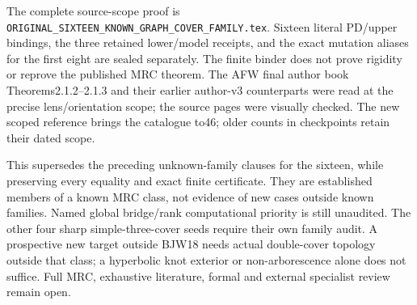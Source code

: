 \documentclass[11pt]{article}
\begin{document}
The complete source-scope proof is
\texttt{ORIGINAL\_SIXTEEN\_KNOWN\_GRAPH\_COVER\_FAMILY.tex}.
Sixteen literal PD/upper bindings, the three retained lower/model receipts,
and the exact mutation aliases for the first eight are sealed separately.
The finite binder does not prove rigidity or reprove the published MRC
theorem. The AFW final author book Theorems2.1.2--2.1.3 and their earlier
author-v3 counterparts were read at the precise lens/orientation scope;
the source pages were visually checked. The new scoped reference brings
the catalogue to46; older counts in checkpoints retain their dated scope.

This supersedes the preceding unknown-family clauses for the sixteen,
while preserving every equality and exact finite certificate. They are
established members of a known MRC class, not evidence of new cases
outside known families. Named global bridge/rank computational priority
is still unaudited. The other four sharp simple-three-cover seeds require
their own family audit. A prospective new target outside BJW18 needs
actual double-cover topology outside that class; a hyperbolic knot exterior
or non-arborescence alone does not suffice. Full MRC, exhaustive literature,
formal and external specialist review remain open.
\end{document}
